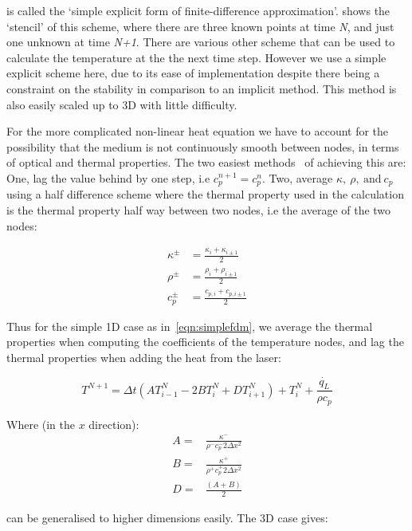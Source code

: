  is called the `simple explicit form of finite-difference approximation'\cite{ozisik1994finite}.  shows the `stencil' of this scheme, where there are three known points at time \textit{N}, and just one unknown at time \textit{N+1}. There are various other scheme that can be used to calculate the temperature at the the next time step. However we use a simple explicit scheme here, due to its ease of implementation despite there being a constraint on the stability in comparison to an implicit method. This method is also easily scaled up to 3D with little difficulty.

\medskip

For the more complicated non-linear heat equation we have to account for the possibility that the medium is not continuously smooth between nodes, in terms of optical and thermal properties. The two easiest methods~\cite{ozisik1994finite} of achieving this are: One, lag the value behind by one step, i.e $c_{p}^{n+1}=c_{p}^{n}$. Two, average $\kappa,\ \rho,\ \text{and}\ c_p$ using a half difference scheme where the thermal property used in the calculation is the thermal property half way between two nodes, i.e the average of the two nodes:

\begin{align}
\kappa^{\pm}&=\frac{\kappa_i+\kappa_{i\pm 1}}{2}\\
\rho^{\pm}&=\frac{\rho_i+\rho_{i\pm 1}}{2}\\
c_p^{\pm}&=\frac{c_{p,i}+c_{p,i\pm 1}}{2}
\end{align}

Thus for the simple 1D case as in~\cref{eqn:simplefdm}, we average the thermal properties when computing the coefficients of the temperature nodes, and lag the thermal properties when adding the heat from the laser:

\begin{equation}
T^{N+1}=\Delta t (AT^N_{i-1}-2BT^N_{i}+DT^N_{i+1})+ T_i^N + \frac{\dot{q_L}}{\rho c_p}\label{eqn:heatnonlin1d}
\end{equation}

Where (in the $x$ direction):
\begin{align}
A=&\frac{\kappa^{-}}{\rho^{-}c_{p}^{-}2\Delta x^2} \nonumber \\
B=&\frac{\kappa^{+}}{\rho^{+}c_{p}^{+}2\Delta x^2} \label{eqn:coeffsABD}\\
D=&\frac{(A+B)}{2} \nonumber
\end{align}

 can be generalised to higher dimensions easily. The 3D case gives:

